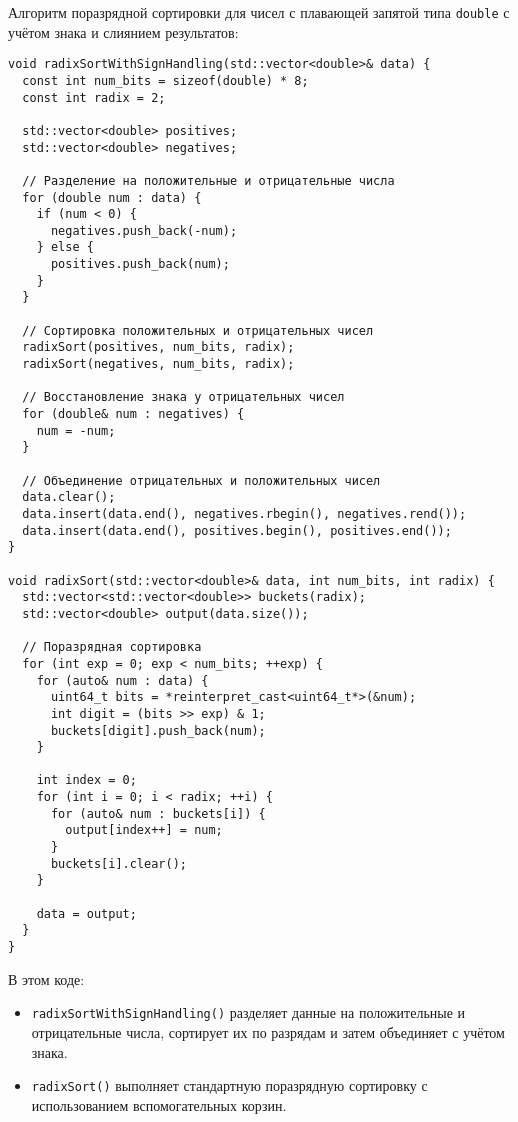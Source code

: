 \documentclass[12pt]{article}
\begin{document}
\hspace*{1.25em}Алгоритм поразрядной сортировки для чисел с плавающей запятой типа \texttt{double} с учётом знака и слиянием результатов:

\begin{verbatim}
void radixSortWithSignHandling(std::vector<double>& data) {
  const int num_bits = sizeof(double) * 8;
  const int radix = 2;

  std::vector<double> positives;
  std::vector<double> negatives;

  // Разделение на положительные и отрицательные числа
  for (double num : data) {
    if (num < 0) {
      negatives.push_back(-num);
    } else {
      positives.push_back(num);
    }
  }

  // Сортировка положительных и отрицательных чисел
  radixSort(positives, num_bits, radix);
  radixSort(negatives, num_bits, radix);

  // Восстановление знака у отрицательных чисел
  for (double& num : negatives) {
    num = -num;
  }

  // Объединение отрицательных и положительных чисел
  data.clear();
  data.insert(data.end(), negatives.rbegin(), negatives.rend());
  data.insert(data.end(), positives.begin(), positives.end());
}

void radixSort(std::vector<double>& data, int num_bits, int radix) {
  std::vector<std::vector<double>> buckets(radix);
  std::vector<double> output(data.size());

  // Поразрядная сортировка
  for (int exp = 0; exp < num_bits; ++exp) {
    for (auto& num : data) {
      uint64_t bits = *reinterpret_cast<uint64_t*>(&num);
      int digit = (bits >> exp) & 1;
      buckets[digit].push_back(num);
    }

    int index = 0;
    for (int i = 0; i < radix; ++i) {
      for (auto& num : buckets[i]) {
        output[index++] = num;
      }
      buckets[i].clear();
    }

    data = output;
  }
}
\end{verbatim}

\hspace*{1.25em}В этом коде:
\begin{itemize}
    \item \texttt{radixSortWithSignHandling()} разделяет данные на положительные и отрицательные числа, сортирует их по разрядам и затем объединяет с учётом знака.
    \item \texttt{radixSort()} выполняет стандартную поразрядную сортировку с использованием вспомогательных корзин.
\end{itemize}
\end{document}
